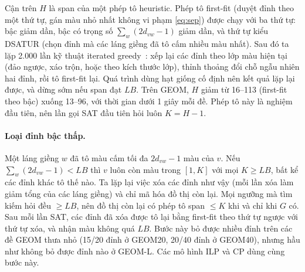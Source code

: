 Cận trên $H$ là span của một phép tô heuristic. Phép tô first-fit (duyệt đỉnh theo một thứ tự, gán màu nhỏ nhất không vi phạm \eqref{eq:sep}) được chạy với ba thứ tự: bậc giảm dần, bậc có trọng số $\sum_w(2d_{vw}-1)$ giảm dần, và thứ tự kiểu DSATUR (chọn đỉnh mà các láng giềng đã tô cấm nhiều màu nhất). Sau đó ta lặp 2.000 lần kỹ thuật iterated greedy~\citep{culberson1992}: xếp lại các đỉnh theo lớp màu hiện tại (đảo ngược, xáo trộn, hoặc theo kích thước lớp), thỉnh thoảng đổi chỗ ngẫu nhiên hai đỉnh, rồi tô first-fit lại. Quá trình dùng hạt giống cố định nên kết quả lặp lại được, và dừng sớm nếu span đạt $LB$. Trên GEOM, $H$ giảm từ 16--113 (first-fit theo bậc) xuống 13--96, với thời gian dưới 1 giây mỗi đề. Phép tô này là nghiệm đầu tiên, nên lần gọi SAT đầu tiên hỏi luôn $K=H-1$.

\paragraph{Loại đỉnh bậc thấp.} Một láng giềng $w$ đã tô màu cấm tối đa $2d_{vw}-1$ màu của $v$. Nếu $\sum_{w}(2d_{vw}-1)<LB$ thì $v$ luôn còn màu trong $[1,K]$ với mọi $K\ge LB$, bất kể các đỉnh khác tô thế nào. Ta lặp lại việc xóa các đỉnh như vậy (mỗi lần xóa làm giảm tổng của các láng giềng) và chỉ mã hóa đồ thị còn lại. Mọi ngưỡng mà tìm kiếm hỏi đều $\ge LB$, nên đồ thị còn lại có phép tô span $\le K$ khi và chỉ khi $G$ có. Sau mỗi lần SAT, các đỉnh đã xóa được tô lại bằng first-fit theo thứ tự ngược với thứ tự xóa, và nhận màu không quá $LB$. Bước này bỏ được nhiều đỉnh trên các đề GEOM thưa nhỏ (15/20 đỉnh ở GEOM20, 20/40 đỉnh ở GEOM40), nhưng hầu như không bỏ được đỉnh nào ở GEOM-L. Các mô hình ILP và CP dùng cùng bước này.

